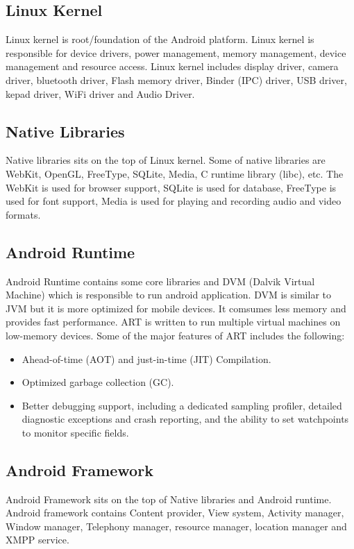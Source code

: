 \subsection{Linux Kernel}
Linux kernel is root/foundation of the Android platform. Linux kernel is responsible for device drivers, power management, memory management, device management and resource access. Linux kernel includes display driver, camera driver, bluetooth driver, Flash memory driver, Binder (IPC) driver, USB driver, kepad driver, WiFi driver and Audio Driver.

\subsection{Native Libraries}
Native libraries sits on the top of Linux kernel. Some of native libraries are WebKit, OpenGL, FreeType, SQLite, Media, C runtime library (libc), etc. The WebKit is used for browser support, SQLite is used for database, FreeType is used for font support, Media is used for playing and recording audio and video formats.

\subsection{Android Runtime}
Android Runtime contains some core libraries and DVM (Dalvik Virtual Machine) which is responsible to run android application. DVM is similar to JVM but it is more optimized for mobile devices. It comsumes less memory and provides fast performance. ART is written to run multiple virtual machines on low-memory devices. Some of the major features of ART includes the following:
\begin{itemize}
    \item Ahead-of-time (AOT) and just-in-time (JIT) Compilation.
    \item Optimized garbage collection (GC).
    \item Better debugging support, including a dedicated sampling profiler, detailed diagnostic exceptions and crash reporting, and the ability to set watchpoints to monitor specific fields.
\end{itemize}

\subsection{Android Framework}
Android Framework sits on the top of Native libraries and Android runtime. Android framework contains Content provider, View system, Activity manager, Window manager, Telephony manager, resource manager, location manager and XMPP service.

